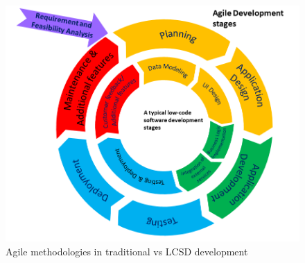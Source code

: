 


\begin{figure}[t]
\centering
\includegraphics[scale=.36]{res/development_cycle.PNG}
\caption{Agile methodologies in traditional vs  LCSD development}
\label{fig:low-code-agile}
\vspace{-5mm}
\end{figure}

